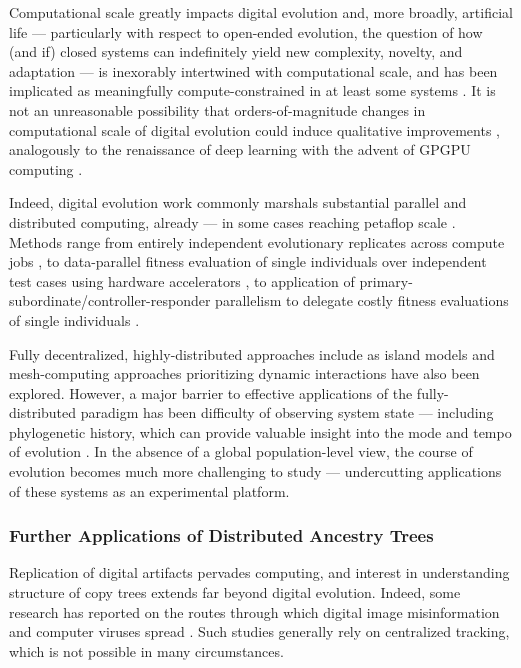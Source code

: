 Computational scale greatly impacts digital evolution and, more broadly, artificial life \citep{ackley2014indefinitely} --- particularly with respect to open-ended evolution, the question of how (and if) closed systems can indefinitely yield new complexity, novelty, and adaptation --- is inexorably intertwined with computational scale, and has been implicated as meaningfully compute-constrained in at least some systems \citep{taylor2016open,channon2019maximum}.
It is not an unreasonable possibility that orders-of-magnitude changes in computational scale of digital evolution could induce qualitative improvements \citep{moreno2022engineering}, analogously to the renaissance of deep learning with the advent of GPGPU computing \citep{krizhevsky2012imagenet}.

Indeed, digital evolution work commonly marshals substantial parallel and distributed computing, already  --- in some cases reaching petaflop scale \citep{gilbert2015artificial}.
Methods range from entirely independent evolutionary replicates across compute jobs \citep{dolson2017spatial, hornby2006automated}, to data-parallel fitness evaluation of single individuals over independent test cases using hardware accelerators \citep{harding2007fast_springer, langdon2019continuous}, to application of primary-subordinate/controller-responder parallelism to delegate costly fitness evaluations of single individuals \citep{cantu2001master,miikkulainen2019evolving}.

Fully decentralized, highly-distributed approaches include as island models \citep{bennett1999building,schulte2010genetic} and mesh-computing approaches prioritizing dynamic interactions \citep{ray1995proposal,ackley2018digital,moreno2021conduit} have also been explored.
However, a major barrier to effective applications of the fully-distributed paradigm has been difficulty of observing system state --- including phylogenetic history, which can provide valuable insight into the mode and tempo of evolution \citep{dolson2020interpreting}.
In the absence of a global population-level view, the course of evolution becomes much more challenging to study --- undercutting applications of these systems as an experimental platform.

\subsubsection{Further Applications of Distributed Ancestry Trees}

Replication of digital artifacts pervades computing, and interest in understanding structure of copy trees extends far beyond digital evolution.
Indeed, some research has reported on the routes through which digital image misinformation and computer viruses spread \citep{friggeri2014rumor,cohen1987computer}.
Such studies generally rely on centralized tracking, which is not possible in many circumstances.

